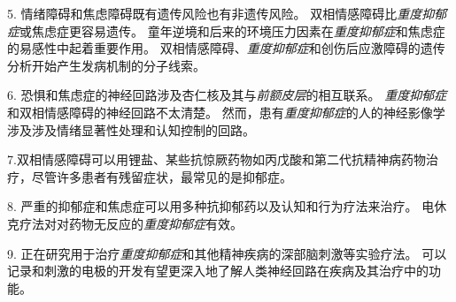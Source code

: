 5. 情绪障碍和焦虑障碍既有遗传风险也有非遗传风险。
双相情感障碍比\textit{重度抑郁症}或焦虑症更容易遗传。
童年逆境和后来的环境压力因素在\textit{重度抑郁症}和焦虑症的易感性中起着重要作用。
双相情感障碍、\textit{重度抑郁症}和创伤后应激障碍的遗传分析开始产生发病机制的分子线索。


6. 恐惧和焦虑症的神经回路涉及杏仁核及其与\textit{前额皮层}的相互联系。
\textit{重度抑郁症}和双相情感障碍的神经回路不太清楚。
然而，患有\textit{重度抑郁症}的人的神经影像学涉及涉及情绪显著性处理和认知控制的回路。


7.双相情感障碍可以用锂盐、某些抗惊厥药物如丙戊酸和第二代抗精神病药物治疗，尽管许多患者有残留症状，最常见的是抑郁症。


8. 严重的抑郁症和焦虑症可以用多种抗抑郁药以及认知和行为疗法来治疗。
电休克疗法对对药物无反应的\textit{重度抑郁症}有效。


9. 正在研究用于治疗\textit{重度抑郁症}和其他精神疾病的深部脑刺激等实验疗法。
可以记录和刺激的电极的开发有望更深入地了解人类神经回路在疾病及其治疗中的功能。




